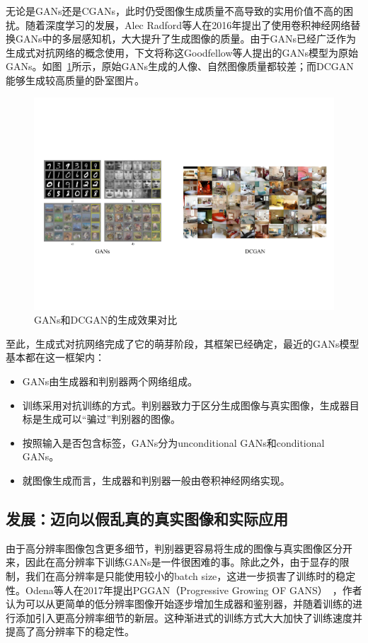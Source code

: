 无论是GANs还是CGANs，此时仍受图像生成质量不高导致的实用价值不高的困扰。随着深度学习的发展，Alec Radford等人在2016年提出了使用卷积神经网络替换GANs中的多层感知机，大大提升了生成图像的质量。由于GANs已经广泛作为生成式对抗网络的概念使用，下文将称这Goodfellow等人提出的GANs模型为原始GANs。如图~\ref{GAN-DCGAN}所示，原始GANs生成的人像、自然图像质量都较差；而DCGAN能够生成较高质量的卧室图片。

\begin{figure}
    \centering
    \includegraphics[width=\textwidth]{figures/GAN-DCGAN.pdf}
    \caption{GANs和DCGAN的生成效果对比}
    \label{GAN-DCGAN}
\end{figure}

至此，生成式对抗网络完成了它的萌芽阶段，其框架已经确定，最近的GANs模型基本都在这一框架内：

\begin{itemize}
\item GANs由生成器和判别器两个网络组成。
\item 训练采用对抗训练的方式。判别器致力于区分生成图像与真实图像，生成器目标是生成可以“骗过”判别器的图像。
\item 按照输入是否包含标签，GANs分为unconditional GANs和conditional GANs。
\item 就图像生成而言，生成器和判别器一般由卷积神经网络实现。
\end{itemize}

\subsection{发展：迈向以假乱真的真实图像和实际应用}
由于高分辨率图像包含更多细节，判别器更容易将生成的图像与真实图像区分开来，因此在高分辨率下训练GANs是一件很困难的事。除此之外，由于显存的限制，我们在高分辨率是只能使用较小的batch size，这进一步损害了训练时的稳定性。Odena等人在2017年提出PGGAN（Progressive Growing OF GANS）~\cite{PGGAN}，作者认为可以从更简单的低分辨率图像开始逐步增加生成器和鉴别器，并随着训练的进行添加引入更高分辨率细节的新层。这种渐进式的训练方式大大加快了训练速度并提高了高分辨率下的稳定性。

